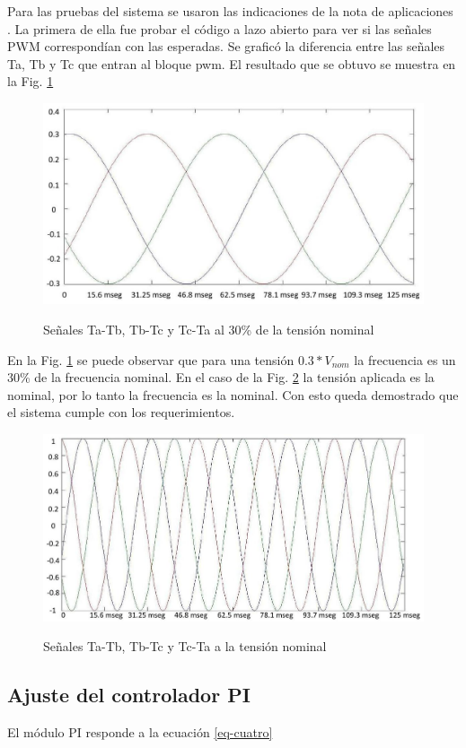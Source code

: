\documentclass[conference]{IEEEtran}
\begin{document}
Para las pruebas del sistema se usaron las indicaciones de la nota de aplicaciones \cite{ti}. La primera de ella fue probar el código a lazo abierto para ver si las señales PWM correspondían con las esperadas. Se graficó la diferencia entre las señales Ta, Tb y Tc que entran al bloque pwm. El resultado que se obtuvo se muestra en la Fig. \ref{fig_TaTb03}

\begin{figure}[!t]
\centering
\includegraphics[width=8 cm]{figuras/figura_19.jpeg}\\
\caption{Señales Ta-Tb, Tb-Tc y Tc-Ta al 30\% de la tensión nominal}  
\label{fig_TaTb03}
\end{figure}

En la Fig. \ref{fig_TaTb03} se puede observar que para una tensión $ 0.3*V_{nom} $ la frecuencia es un 30\% de la frecuencia nominal. En el caso de la Fig. \ref{fig_TaTb} la tensión aplicada es la nominal, por lo tanto la frecuencia es la nominal. Con esto queda demostrado que el sistema cumple con los requerimientos.

\begin{figure}[!t]
\centering
\includegraphics[width=8 cm]{figuras/figura_20.jpeg} \\
\caption{Señales Ta-Tb, Tb-Tc y Tc-Ta a la tensión nominal}
\label{fig_TaTb}
\end{figure}


\subsection{Ajuste del controlador PI}

El módulo PI responde a la ecuación \ref{eq-cuatro}
\end{document}
